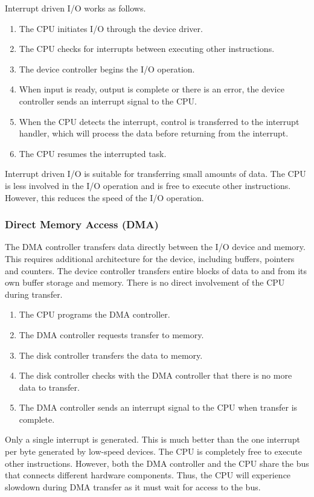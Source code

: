 Interrupt driven I/O works as follows.
\begin{enumerate}
  \item The CPU initiates I/O through the device driver.
  \item The CPU checks for interrupts between executing other instructions.
  \item The device controller begins the I/O operation.
  \item When input is ready, output is complete or there is an error, the device controller sends an interrupt signal to the CPU.
  \item When the CPU detects the interrupt, control is transferred to the interrupt handler, which will process the data before returning from the interrupt.
  \item The CPU resumes the interrupted task.
\end{enumerate}

Interrupt driven I/O is suitable for transferring small amounts of data.
The CPU is less involved in the I/O operation and is free to execute other instructions.
However, this reduces the speed of the I/O operation.

\subsubsection{Direct Memory Access (DMA)}

The DMA controller transfers data directly between the I/O device and memory.
This requires additional architecture for the device, including buffers, pointers and counters.
The device controller transfers entire blocks of data to and from its own buffer storage and memory.
There is no direct involvement of the CPU during transfer.

\begin{enumerate}
  \item The CPU programs the DMA controller.
  \item The DMA controller requests transfer to memory.
  \item The disk controller transfers the data to memory.
  \item The disk controller checks with the DMA controller that there is no more data to transfer.
  \item The DMA controller sends an interrupt signal to the CPU when transfer is complete.
\end{enumerate}

Only a single interrupt is generated.
This is much better than the one interrupt per byte generated by low-speed devices.
The CPU is completely free to execute other instructions.
However, both the DMA controller and the CPU share the bus that connects different hardware components.
Thus, the CPU will experience slowdown during DMA transfer as it must wait for access to the bus.

